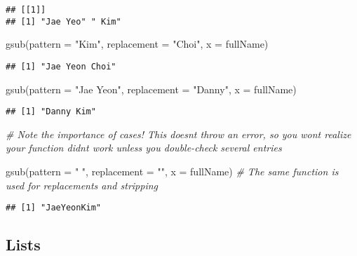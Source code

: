 \documentclass[
]{book}
\newenvironment{Shaded}{\begin{snugshade}}{\end{snugshade}}
\newcommand{\AttributeTok}[1]{\textcolor[rgb]{0.77,0.63,0.00}{#1}}
\newcommand{\CommentTok}[1]{\textcolor[rgb]{0.56,0.35,0.01}{\textit{#1}}}
\newcommand{\FunctionTok}[1]{\textcolor[rgb]{0.00,0.00,0.00}{#1}}
\newcommand{\NormalTok}[1]{#1}
\newcommand{\StringTok}[1]{\textcolor[rgb]{0.31,0.60,0.02}{#1}}
\begin{document}
\begin{verbatim}
## [[1]]
## [1] "Jae Yeo" " Kim"
\end{verbatim}

\begin{Shaded}
\begin{Highlighting}[]
\FunctionTok{gsub}\NormalTok{(}\AttributeTok{pattern =} \StringTok{"Kim"}\NormalTok{, }\AttributeTok{replacement =} \StringTok{"Choi"}\NormalTok{, }\AttributeTok{x =}\NormalTok{ fullName)}
\end{Highlighting}
\end{Shaded}

\begin{verbatim}
## [1] "Jae Yeon Choi"
\end{verbatim}

\begin{Shaded}
\begin{Highlighting}[]
\FunctionTok{gsub}\NormalTok{(}\AttributeTok{pattern =} \StringTok{"Jae Yeon"}\NormalTok{, }\AttributeTok{replacement =} \StringTok{"Danny"}\NormalTok{, }\AttributeTok{x =}\NormalTok{ fullName)}
\end{Highlighting}
\end{Shaded}

\begin{verbatim}
## [1] "Danny Kim"
\end{verbatim}

\begin{Shaded}
\begin{Highlighting}[]
\CommentTok{\# Note the importance of cases! This doesn\textquotesingle{}t throw an error, so you won\textquotesingle{}t realize your function didn\textquotesingle{}t work unless you double{-}check several entries}

\FunctionTok{gsub}\NormalTok{(}\AttributeTok{pattern =} \StringTok{" "}\NormalTok{, }\AttributeTok{replacement =} \StringTok{""}\NormalTok{, }\AttributeTok{x =}\NormalTok{ fullName) }\CommentTok{\# The same function is used for replacements and stripping}
\end{Highlighting}
\end{Shaded}

\begin{verbatim}
## [1] "JaeYeonKim"
\end{verbatim}

\hypertarget{lists-1}{%
\subsection{Lists}\label{lists-1}}
\end{document}
